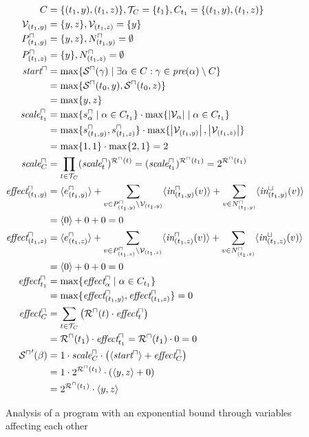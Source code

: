 \begin{figure}
\begin{align*}
  C &= \lbrace (t_1,y), (t_1,z) \rbrace, \mathcal{T}_C = \lbrace t_1 \rbrace, C_{t_1} = \lbrace (t_1,y), (t_1,z) \rbrace \\
  \mathcal{V}_{(t_1,y)} &= \lbrace y,z \rbrace, \mathcal{V}_{(t_1,z)} = \lbrace y \rbrace \\
  P^\sqcap_{(t_1,y)} &= \lbrace y,z \rbrace, N^\sqcap_{(t_1,y)} = \emptyset \\
  P^\sqcap_{(t_1,z)} &= \lbrace y \rbrace, N^\sqcap_{(t_1,z)} = \emptyset \\
  \emph{start}^\sqcap &= \max \lbrace {\mathcal{S}^\sqcap}(\gamma) \mid \exists \alpha \in C: \gamma \in \emph{pre}(\alpha) \setminus C \rbrace \\
  &= \max \lbrace {\mathcal{S}^\sqcap}(t_0,y), {\mathcal{S}^\sqcap}(t_0,z) \rbrace \\
  &= \max \lbrace y,z \rbrace \\
  \emph{scale}^\sqcap_{t_1} &= \max \lbrace s^\sqcap_\alpha \mid \alpha \in C_{t_1} \rbrace \cdot \max \lbrace \left|\mathcal{V}_\alpha\right| \mid \alpha \in C_{t_1} \rbrace \\
  &= \max \lbrace s^\sqcap_{(t_1,y)}, s^\sqcap_{(t_1,z)} \rbrace \cdot \max \lbrace \left|\mathcal{V}_{(t_1,y)}\right|, \left|\mathcal{V}_{(t_1,z)}\right| \rbrace \\
  &= \max \lbrace 1,1 \rbrace \cdot \max \lbrace 2,1 \rbrace = 2 \\
  \emph{scale}^\sqcap_C &= \prod_{t \in \mathcal{T}_C} (\emph{scale}^\sqcap_t)^{{\mathcal{R}^\sqcap}(t)} = (\emph{scale}^\sqcap_{t_1})^{{\mathcal{R}^\sqcap}(t_1)} = 2^{{\mathcal{R}^\sqcap}(t_1)} \\
  \emph{effect}^\sqcap_{(t_1,y)} &= \langle e^{\sqcap}_{(t_1,y)}\rangle + \sum_{v \in P_{(t_1,y)}^\sqcap \setminus \mathcal{V}_{(t_1,y)}} \langle\emph{in}^\sqcap_{(t_1,y)}(v)\rangle + \sum_{v \in N_{(t_1,y)}^\sqcap} \langle\emph{in}^\sqcup_{(t_1,y)}(v)\rangle \\
  &= \langle0\rangle + 0 + 0 = 0 \\
  \emph{effect}^\sqcap_{(t_1,z)} &= \langle e^{\sqcap}_{(t_1,z)}\rangle + \sum_{v \in P_{(t_1,z)}^\sqcap \setminus \mathcal{V}_{(t_1,z)}} \langle\emph{in}^\sqcap_{(t_1,z)}(v)\rangle + \sum_{v \in N_{(t_1,z)}^\sqcap} \langle\emph{in}^\sqcup_{(t_1,z)}(v)\rangle \\
  &= \langle0\rangle + 0 + 0 = 0 \\
  \emph{effect}^\sqcap_{t_1} &= \max \lbrace \emph{effect}^\sqcap_\alpha \mid \alpha \in C_{t_1}  \rbrace \\
  &= \max \lbrace \emph{effect}^\sqcap_{(t_1,y)}, \emph{effect}^\sqcap_{(t_1,z)} \rbrace = 0 \\
  \emph{effect}^\sqcap_C &= \sum_{t \in \mathcal{T}_C} \left( {\mathcal{R}^\sqcap}(t) \cdot \emph{effect}^\sqcap_t \right) \\
  &= {\mathcal{R}^\sqcap}(t_1) \cdot \emph{effect}^\sqcap_{t_1} = {\mathcal{R}^\sqcap}(t_1) \cdot 0 = 0 \\
  {\mathcal{S}^\sqcap}'(\beta) &= 1 \cdot \emph{scale}^\sqcap_C \cdot \left( \langle\emph{start}^\sqcap\rangle + \emph{effect}^\sqcap_C \right) \\
  &= 1 \cdot 2^{{\mathcal{R}^\sqcap}(t_1)} \cdot \left( \langle y,z\rangle + 0 \right) \\
  &= 2^{{\mathcal{R}^\sqcap}(t_1)} \cdot \langle y,z\rangle
\end{align*}

\caption{Analysis of a program with an exponential bound through variables affecting each other}
\label{fig:exp_with_vars}
\end{figure}

